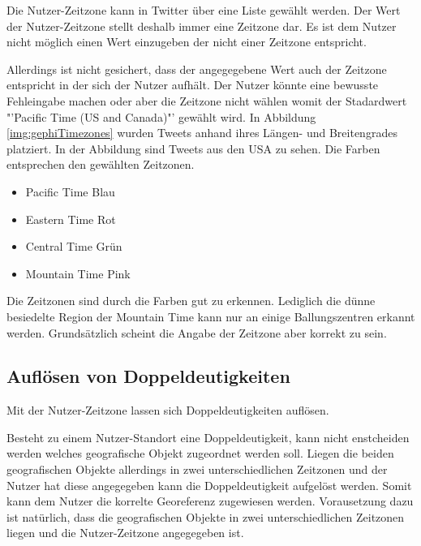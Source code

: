 			Die Nutzer-Zeitzone kann in Twitter über eine Liste gewählt werden.
			Der Wert der Nutzer-Zeitzone stellt deshalb immer eine Zeitzone dar.
			Es ist dem Nutzer nicht möglich einen Wert einzugeben der nicht einer Zeitzone entspricht.

			Allerdings ist nicht gesichert, dass der angegegebene Wert auch der Zeitzone entspricht in der sich der Nutzer aufhält.
			Der Nutzer könnte eine bewusste Fehleingabe machen oder aber die Zeitzone nicht wählen womit der Stadardwert "'Pacific Time (US and Canada)"' gewählt wird.
			In Abbildung \ref{img:gephiTimezones} wurden Tweets anhand ihres Längen- und Breitengrades platziert.
			In der Abbildung sind Tweets aus den USA zu sehen. 
			Die Farben entsprechen den gewählten Zeitzonen.

			\begin{itemize}
			 	\item Pacific Time Blau
			 	\item Eastern Time	Rot
			 	\item Central Time Grün
			 	\item Mountain Time Pink 
			 \end{itemize} 

			 Die Zeitzonen sind durch die Farben gut zu erkennen. 
			 Lediglich die dünne besiedelte Region der Mountain Time kann nur an einige Ballungszentren erkannt werden. 
			 Grundsätzlich scheint die Angabe der Zeitzone aber korrekt zu sein.



		\subsection{Auflösen von Doppeldeutigkeiten}

			Mit der Nutzer-Zeitzone lassen sich Doppeldeutigkeiten auflösen. 

			Besteht zu einem Nutzer-Standort eine Doppeldeutigkeit, kann nicht enstcheiden werden welches geografische Objekt zugeordnet werden soll.
			Liegen die beiden geografischen Objekte allerdings in zwei unterschiedlichen Zeitzonen und der Nutzer hat diese angegegeben kann die Doppeldeutigkeit aufgelöst werden.
			Somit kann dem Nutzer die korrelte Georeferenz zugewiesen werden.
			Vorausetzung dazu ist natürlich, dass die geografischen Objekte in zwei unterschiedlichen Zeitzonen liegen und die Nutzer-Zeitzone angegegeben ist.

